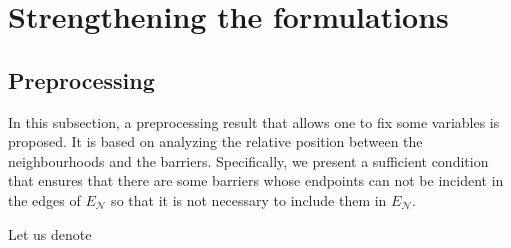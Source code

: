 \documentclass[a4paper,  review, authoryear, 1p.]{elsarticle}
\newcommand{\EN}{{E^{}_{\mathcal N}}}
\newcommand{\determinant}[3]{\det({#1|#2#3})}
\begin{document}
		
		\section{Strengthening the formulations}\label{section:strengthening}
		
		\subsection{Preprocessing}\label{subsection:preprocessing}
		In this subsection, a preprocessing result that allows one to fix some variables is proposed. It is based on analyzing the relative position between the neighbourhoods and the barriers.
		Specifically, we present a sufficient condition that ensures that there are some barriers whose endpoints can not be incident in the edges of $\EN$ so that it is not necessary to include them in $\EN$. 
		
		Let us denote
		
\end{document}
